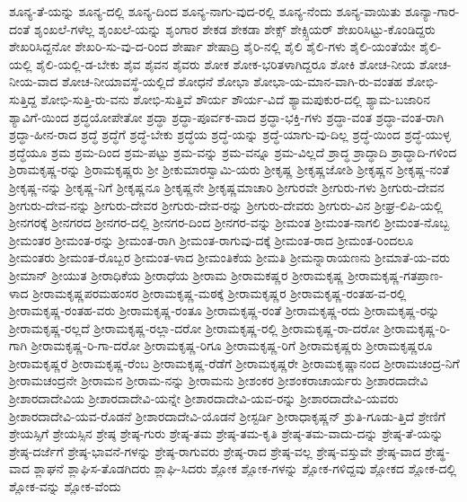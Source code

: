 {ಶೂನ್ಯ-ತೆ-ಯನ್ನು
ಶೂನ್ಯ-ದಲ್ಲಿ
ಶೂನ್ಯ-ದಿಂದ
ಶೂನ್ಯ-ನಾಗು-ವುದ-ರಲ್ಲಿ
ಶೂನ್ಯ-ನೆಂದು
ಶೂನ್ಯ-ವಾಯಿತು
ಶೂನ್ಯಾ-ಗಾರ-ದಂತೆ
ಶೃಂಖಲೆ-ಗಳೆಲ್ಲ
ಶೃಂಖಲೆ-ಯನ್ನು
ಶೃಂಗಾರ
ಶೇಕಡ
ಶೇಕಡಾ
ಶೇಕ್ಸ್
ಶೇಕ್ಸ್ಪಿಯರ್
ಶೇಖರಿಸಿಟ್ಟು-ಕೊಂಡಿದ್ದರು
ಶೇಖರಿಸಿದ್ದನೋ
ಶೇಖರಿ-ಸು-ವು-ದ-ರಿಂದ
ಶೇರ್ಷಾ
ಶೇಷಾದ್ರಿ
ಶೈರಿ-ನಲ್ಲಿ
ಶೈಲಿ
ಶೈಲಿ-ಗಳು
ಶೈಲಿ-ಯಂತೆಯೇ
ಶೈಲಿ-ಯಲ್ಲಿ
ಶೈಲಿ-ಯಲ್ಲಿ-ಡ-ಬೇಕು
ಶೈವ
ಶೈವನ
ಶೈವರು
ಶೋಕ
ಶೋಕ-ಭರಿತಳಾಗಿದ್ದರೂ
ಶೋಕಿ
ಶೋಚ-ನೀಯ
ಶೋಚ-ನೀಯ-ವಾದ
ಶೋಚ-ನೀಯಾವಸ್ಥೆ-ಯಲ್ಲಿದೆ
ಶೋಧನೆ
ಶೋಭಾ
ಶೋಭಾ-ಯ-ಮಾನ-ವಾಗಿ-ರು-ವಂತಹ
ಶೋಭಿ-ಸುತ್ತಿದ್ದ
ಶೋಭಿ-ಸುತ್ತಿ-ರು-ವನು
ಶೋಭಿ-ಸುತ್ತಿವೆ
ಶೌರ್ಯ
ಶೌರ್ಯ-ವಿದೆ
ಶ್ಯಾಮಪುಕುರ-ದಲ್ಲಿ
ಶ್ಯಾಮ-ಬಜಾರಿನ
ಶ್ಯಾವಿಗೆ-ಯಿಂದ
ಶ್ರದ್ಧಯೋಪೇತೋ
ಶ್ರದ್ಧಾ
ಶ್ರದ್ಧಾ-ಪೂರ್ವಕ-ವಾದ
ಶ್ರದ್ಧಾ-ಭಕ್ತಿ-ಗಳು
ಶ್ರದ್ಧಾ-ವಂತ
ಶ್ರದ್ಧಾ-ವಂತ-ರಾಗಿ
ಶ್ರದ್ಧಾ-ಹೀನ-ರಾದ
ಶ್ರದ್ಧೆ
ಶ್ರದ್ಧೆಗೆ
ಶ್ರದ್ಧೆ-ಬೇಕು
ಶ್ರದ್ಧೆಯ
ಶ್ರದ್ಧೆ-ಯನ್ನು
ಶ್ರದ್ಧೆ-ಯಾಗು-ವು-ದಿಲ್ಲ
ಶ್ರದ್ಧೆ-ಯಿಂದ
ಶ್ರದ್ಧೆ-ಯುಳ್ಳ
ಶ್ರದ್ಧೆಯೂ
ಶ್ರಮ
ಶ್ರಮ-ದಿಂದ
ಶ್ರಮ-ಪಟ್ಟು
ಶ್ರಮ-ವನ್ನು
ಶ್ರಮ-ವನ್ನೂ
ಶ್ರಮ-ವಿಲ್ಲದೆ
ಶ್ರಾದ್ಧ
ಶ್ರಾದ್ಧಾದಿ
ಶ್ರಾದ್ಧಾದಿ-ಗಳಿಂದ
ಶ್ರಿರಾಮಕೃಷ್ಣ-ರನ್ನು
ಶ್ರಿರಾಮಕೃಷ್ಣರು
ಶ್ರೀ
ಶ್ರೀಕುಮಾರಸ್ವಾಮಿ-ಯರು
ಶ್ರೀಕೃಷ್ಣ
ಶ್ರೀಕೃಷ್ಣಜೋಶಿ
ಶ್ರೀಕೃಷ್ಣನ
ಶ್ರೀಕೃಷ್ಣ-ನಂತೆ
ಶ್ರೀಕೃಷ್ಣ-ನನ್ನು
ಶ್ರೀಕೃಷ್ಣ-ನಿಗೆ
ಶ್ರೀಕೃಷ್ಣನೂ
ಶ್ರೀಕೃಷ್ಣನೇ
ಶ್ರೀಕೃಷ್ಣಮಾಚಾರಿ
ಶ್ರೀಗುರವೇ
ಶ್ರೀಗುರು-ಗಳು
ಶ್ರೀಗುರು-ದೇವನ
ಶ್ರೀಗುರು-ದೇವ-ನನ್ನು
ಶ್ರೀಗುರು-ದೇವರ
ಶ್ರೀಗುರು-ದೇವ-ರನ್ನು
ಶ್ರೀಗುರು-ದೇವರು
ಶ್ರೀಗುರು-ವಿನ
ಶ್ರೀಘ್ರ-ಲಿಪಿ-ಯಲ್ಲಿ
ಶ್ರೀನಗರಕ್ಕೆ
ಶ್ರೀನಗರದ
ಶ್ರೀನಗರ-ದಲ್ಲಿ
ಶ್ರೀನಗರ-ದಿಂದ
ಶ್ರೀನಗರ-ವನ್ನು
ಶ್ರೀಮಂತ
ಶ್ರೀಮಂತ-ನಾಗಲಿ
ಶ್ರೀಮಂತ-ನೊಬ್ಬ
ಶ್ರೀಮಂತರ
ಶ್ರೀಮಂತ-ರನ್ನು
ಶ್ರೀಮಂತ-ರಾಗಿ
ಶ್ರೀಮಂತ-ರಾಗುವು-ದಕ್ಕೆ
ಶ್ರೀಮಂತ-ರಾದ
ಶ್ರೀಮಂತ-ರಿಂದಲೂ
ಶ್ರೀಮಂತರು
ಶ್ರೀಮಂತ-ರೊಬ್ಬರ
ಶ್ರೀಮಂತ-ಳಾದ
ಶ್ರೀಮಂತಿಕೆಯ
ಶ್ರೀಮತಿ
ಶ್ರೀಮನ್ನಾರಾಯಣನು
ಶ್ರೀಮಾತೆ-ಯ-ವರು
ಶ್ರೀಮಾನ್
ಶ್ರೀಯುತ
ಶ್ರೀರಾಧಿಕೆಯ
ಶ್ರೀರಾಧೆಯ
ಶ್ರೀರಾಮ
ಶ್ರೀರಾಮಕಷ್ಣರ
ಶ್ರೀರಾಮಕೃಷ್ಣ
ಶ್ರೀರಾಮಕೃಷ್ಣ-ಗತಪ್ರಾಣ-ಳಾದ
ಶ್ರೀರಾಮಕೃಷ್ಣಪರಮಹಂಸರ
ಶ್ರೀರಾಮಕೃಷ್ಣ-ಮಠಕ್ಕೆ
ಶ್ರೀರಾಮಕೃಷ್ಣರ
ಶ್ರೀರಾಮಕೃಷ್ಣ-ರಂತಹ-ವ-ರಲ್ಲಿ
ಶ್ರೀರಾಮಕೃಷ್ಣ-ರಂತಹ-ವರು
ಶ್ರೀರಾಮಕೃಷ್ಣ-ರಂತೂ
ಶ್ರೀರಾಮಕೃಷ್ಣ-ರಂತೆ
ಶ್ರೀರಾಮಕೃಷ್ಣ-ರದು
ಶ್ರೀರಾಮಕೃಷ್ಣ-ರನ್ನು
ಶ್ರೀರಾಮಕೃಷ್ಣ-ರಲ್ಲದೆ
ಶ್ರೀರಾಮಕೃಷ್ಣ-ರಲ್ಲಾ-ದರೋ
ಶ್ರೀರಾಮಕೃಷ್ಣ-ರಲ್ಲಿ
ಶ್ರೀರಾಮಕೃಷ್ಣ-ರಾ-ದರೋ
ಶ್ರೀರಾಮಕೃಷ್ಣ-ರಿ-ಗಾಗಿ
ಶ್ರೀರಾಮಕೃಷ್ಣ-ರಿ-ಗಾ-ದರೋ
ಶ್ರೀರಾಮಕೃಷ್ಣ-ರಿಗೂ
ಶ್ರೀರಾಮಕೃಷ್ಣ-ರಿಗೆ
ಶ್ರೀರಾಮಕೃಷ್ಣರು
ಶ್ರೀರಾಮಕೃಷ್ಣರೂ
ಶ್ರೀರಾಮಕೃಷ್ಣರೆ
ಶ್ರೀರಾಮಕೃಷ್ಣ-ರೆಂಬ
ಶ್ರೀರಾಮಕೃಷ್ಣ-ರೆಡೆಗೆ
ಶ್ರೀರಾಮಕೃಷ್ಣರೇ
ಶ್ರೀರಾಮಕೃಷ್ಣಾನಂದ
ಶ್ರೀರಾಮಚಂದ್ರ-ನಿಗೆ
ಶ್ರೀರಾಮಚಂದ್ರನೇ
ಶ್ರೀರಾಮನ
ಶ್ರೀರಾಮ-ನನ್ನು
ಶ್ರೀರಾಮನು
ಶ್ರೀಶಂಕರ
ಶ್ರೀಶಂಕರಾಚಾರ್ಯರು
ಶ್ರೀಶಾರದಾದೇವಿ
ಶ್ರೀಶಾರದಾದೇವಿಯ
ಶ್ರೀಶಾರದಾದೇವಿ-ಯನ್ನೇ
ಶ್ರೀಶಾರದಾದೇವಿ-ಯವ-ರನ್ನು
ಶ್ರೀಶಾರದಾದೇವಿ-ಯವರು
ಶ್ರೀಶಾರದಾದೇವಿ-ಯವ-ರೊಡನೆ
ಶ್ರೀಶಾರದಾದೇವಿ-ಯೊಡನೆ
ಶ್ರೀಸ್ಟರ್ಡಿ
ಶ್ರೀರಾಧಾಕೃಷ್ಣನ್
ಶ್ರುತಿ-ಗೂಡು-ತ್ತಿದೆ
ಶ್ರೇಣಿಗೆ
ಶ್ರೇಯಸ್ಸಿಗೆ
ಶ್ರೇಯಸ್ಸಿನ
ಶ್ರೇಷ್ಠ
ಶ್ರೇಷ್ಠ-ಗುರು
ಶ್ರೇಷ್ಠ-ತಮ
ಶ್ರೇಷ್ಠ-ತಮ-ಕೃತಿ
ಶ್ರೇಷ್ಠ-ತಮ-ವಾದು-ದನ್ನು
ಶ್ರೇಷ್ಠ-ತೆ-ಯನ್ನು
ಶ್ರೇಷ್ಠ-ದರ್ಜೆಗೆ
ಶ್ರೇಷ್ಠ-ಭಾವನೆ-ಗಳನ್ನು
ಶ್ರೇಷ್ಠ-ರಾಗುವರು
ಶ್ರೇಷ್ಠ-ರಾದ
ಶ್ರೇಷ್ಠ-ವಲ್ಲ
ಶ್ರೇಷ್ಠ-ವಸ್ತುವೇ
ಶ್ರೇಷ್ಠ-ವಾದ
ಶ್ರೇಷ್ಥ-ವಾದ
ಶ್ಲಾಘನೆ
ಶ್ಲಾಘಿಸ-ತೊಡಗಿದರು
ಶ್ಲಾಘಿ-ಸಿದರು
ಶ್ಲೋಕ
ಶ್ಲೋಕ-ಗಳನ್ನು
ಶ್ಲೋಕ-ಗಳಿದ್ದವು
ಶ್ಲೋಕದ
ಶ್ಲೋಕ-ದಲ್ಲಿ
ಶ್ಲೋಕ-ವನ್ನು
ಶ್ಲೋಕ-ವೆಂದು
}
